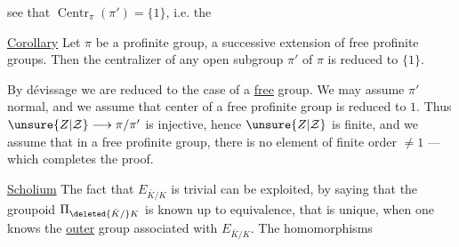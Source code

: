 see that $\operatorname{Centr}_{\pi}(\pi')=\{1\}$, i.e. the

\uline{Corollary} Let $\pi$ be a profinite group, a successive extension of free profinite groups. Then the centralizer  of any open subgroup $\pi'$ of $\pi$ is reduced to $\{1\}$.

By dévissage we are reduced to the case of a \uline{free}  group.  We may assume $\pi'$ normal, and we assume that  center of a free profinite group is reduced to $1$.
Thus $\unsure{Z|\mathcal Z}\longrightarrow\pi/\pi'$ is injective, hence $\unsure{Z|\mathcal Z}$ is finite, and we assume that in a free profinite group, there is no element of finite order $\neq1$ --- which completes the proof.

\uline{Scholium} The fact that $E_{\bar K/K}$ is  trivial  can be exploited, by saying that the groupoid $\Pi_{\deleted{\bar K/}K}$  is known up to equivalence,  that is unique, when one knows the \uline{outer} group associated with $E_{\bar K/K}$. The homomorphisms
